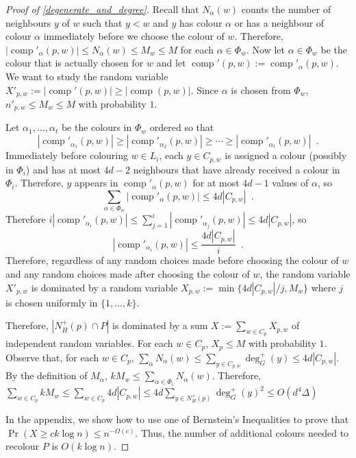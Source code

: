\documentclass{patmorin}
\DeclareMathOperator{\comp}{comp}
\begin{document}
\begin{proof}[Proof of \cref{degenerate_and_degree}]
  Recall that $N_\alpha(w)$ counts the number of neighbours $y$ of $w$ such that $y < w$ and $y$ has colour $\alpha$ or has a neighbour of colour $\alpha$ immediately before we choose the colour of $w$.  Therefore,  $|\comp'_\alpha(p,w)|\le N_\alpha(w)\le M_w\le M$ for each $\alpha\in\Phi_w$.  Now let $\alpha\in\Phi_w$ be the colour that is actually chosen for $w$ and let $\comp'(p,w):=\comp'_\alpha(p,w)$.  We want to study the random variable $X'_{p,w}:=|\comp'(p,w)|\ge |\comp(p,w)|$.  Since $\alpha$ is chosen from $\Phi_w$, $n'_{p,w}\le M_w\le M$ with probability $1$.

  Let $\alpha_1,\ldots,\alpha_t$ be the colours in $\Phi_w$ ordered so that
  \[
    |\comp'_{\alpha_1}(p,w)|\ge|\comp'_{\alpha_2}(p,w)|\ge\cdots\ge |\comp'_{\alpha_t}(p,w)| \enspace .
  \]
  Immediately before colouring $w\in L_i$, each $y\in C_{p,w}$ is assigned a colour (possibly in $\Phi_i$) and has at most $4d-2$ neighbours that have already received a colour in $\Phi_i$.  Therefore, $y$ appears in
  $\comp'_{\alpha}(p,w)$ for at most $4d-1$ values of $\alpha$, so
  \[
    \sum_{\alpha\in\Phi_w} |\comp'_{\alpha}(p,w)| \le 4d| C_{p,w}| \enspace .
  \]
  Therefore $i|\comp'_{\alpha_i}(p,w)|\le\sum_{j=1}^i|\comp'_{\alpha_j}(p,w)|\le 4d|C_{p,w}|$, so
  \[
    |\comp'_{\alpha_i}(p,w)|\le \frac{4d|C_{p,w}|}{i} \enspace .
  \]
  Therefore, regardless of any random choices made before choosing the colour of $w$ and any random choices made after choosing the colour of $w$, the random variable $X'_{p,w}$ is dominated by a random variable $X_{p,w}:=\min\{4d|C_{p,w}|/j,M_w\}$ where $j$ is chosen uniformly in $\{1,\ldots,k\}$.

  Therefore, $|N^+_H(p)\cap P|$ is dominated by a sum $X:=\sum_{w\in C_p} X_{p,w}$ of independent random variables.  For each $w\in C_p$, $X_p\le M$ with probability $1$. Observe that, for each $w\in C_p$,
  $\sum_{\alpha} N_{\alpha}(w)\le \sum_{y\in C_{p,w}}\deg_G^+(y)\le 4d|C_{p,w}|$.  By the definition of $M_\alpha$, $kM_w \le \sum_{\alpha\in\Phi_i} N_\alpha(w)$.  Therefore, $\sum_{w\in C_p}kM_w\le \sum_{w\in C_p} 4d|C_{p,w}|\le 4d\sum_{y\in N^+_H(p)}\deg_G^+(y)^2\le O(d^4\Delta)$







    In the appendix, we show how to use one of Bernstein's Inequalities to prove that $\Pr(X\ge ck\log n)\le n^{-\Omega(c)}$.  Thus, the number of additional colours needed to recolour $P$ is $O(k\log n)$.
\end{proof}
\end{document}
